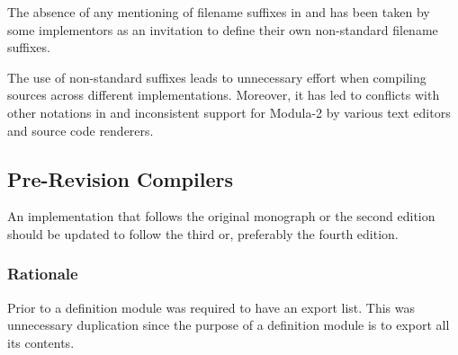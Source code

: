 \documentclass[10pt,a4paper]{article}
\begin{document}
The absence of any mentioning of filename suffixes in \cite{Wirth78} and
\cite{Wirth88} has been taken by some implementors as an invitation to
define their own non-standard filename suffixes.

The use of non-standard suffixes leads to unnecessary effort when compiling
sources across different implementations. Moreover, it has led to conflicts
with other notations in and inconsistent support for Modula-2 by various text
editors and source code renderers.


\subsection{Pre-Revision Compilers}
An implementation that follows the original monograph \cite{Wirth78} or the
second edition \cite{Wirth83} should be updated to follow the third
\cite{Wirth85} or, preferably the fourth \cite{Wirth88} edition.

\subsubsection{Rationale}
Prior to \cite{Wirth85} a definition module was required to have an export
list. This was unnecessary duplication since the purpose of a definition
module is to export all its contents. 


\newpage

\printglossary[title=Definitions, toctitle=Definitions]




\end{document}
